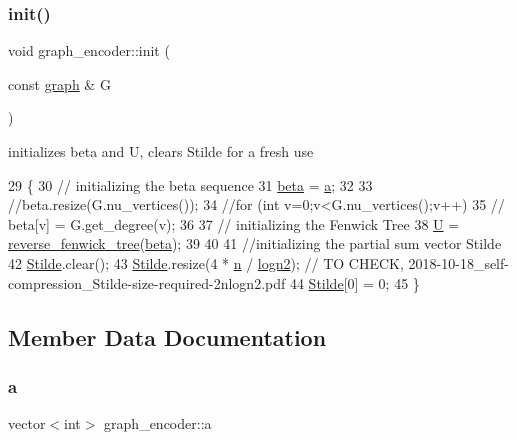 \subsubsection{\texorpdfstring{init()}{init()}}
{\footnotesize\ttfamily void graph\+\_\+encoder\+::init (\begin{DoxyParamCaption}\item[{const \hyperlink{classgraph}{graph} \&}]{G }\end{DoxyParamCaption})}



initializes beta and U, clears Stilde for a fresh use 


\begin{DoxyCode}
29 \{
30   \textcolor{comment}{// initializing the beta sequence}
31   \hyperlink{classgraph__encoder_a40880adecfd63fb86e94b4b0fc3f6bc2}{beta} = \hyperlink{classgraph__encoder_a56eb5cf480ae5c2fca9f3a45f2ffd4f1}{a}; 
32 
33   \textcolor{comment}{//beta.resize(G.nu\_vertices());}
34   \textcolor{comment}{//for (int v=0;v<G.nu\_vertices();v++)}
35   \textcolor{comment}{//  beta[v] = G.get\_degree(v);  }
36 
37   \textcolor{comment}{// initializing the Fenwick Tree}
38   \hyperlink{classgraph__encoder_a3314c40920f2ee132958a6b0ce7e7995}{U} = \hyperlink{classreverse__fenwick__tree}{reverse\_fenwick\_tree}(\hyperlink{classgraph__encoder_a40880adecfd63fb86e94b4b0fc3f6bc2}{beta});
39 
40 
41   \textcolor{comment}{//initializing the partial sum vector Stilde}
42   \hyperlink{classgraph__encoder_a342688a3fdee511b7fae3f155cfb10cf}{Stilde}.clear();
43   \hyperlink{classgraph__encoder_a342688a3fdee511b7fae3f155cfb10cf}{Stilde}.resize(4 * \hyperlink{classgraph__encoder_a7fedc9ace19e34abb32f1851c8597591}{n} / \hyperlink{classgraph__encoder_a27fde3a95a280304877b1e37fc4d8553}{logn2}); \textcolor{comment}{// TO CHECK,
       2018-10-18\_self-compression\_Stilde-size-required-2nlogn2.pdf}
44   \hyperlink{classgraph__encoder_a342688a3fdee511b7fae3f155cfb10cf}{Stilde}[0] = 0;
45 \}
\end{DoxyCode}


\subsection{Member Data Documentation}
\mbox{\label{classgraph__encoder_a56eb5cf480ae5c2fca9f3a45f2ffd4f1}} 
\subsubsection{\texorpdfstring{a}{a}}
{\footnotesize\ttfamily vector$<$int$>$ graph\+\_\+encoder\+::a\hspace{0.3cm}{\ttfamily [private]}}



